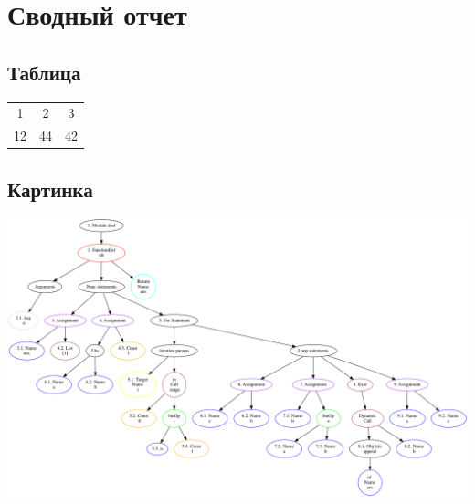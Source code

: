 \documentclass{article}
\begin{document}
\section{Сводный отчет}
\subsection{Таблица}
\begin{center}
\begin{tabular}{ c c c }
1 & 2 & 3 \\ 
12 & 44 & 42 \\
\end{tabular}
\end{center}
\subsection{Картинка}
\includegraphics[scale=0.25]{artifacts/ast.png}
\end{document}
